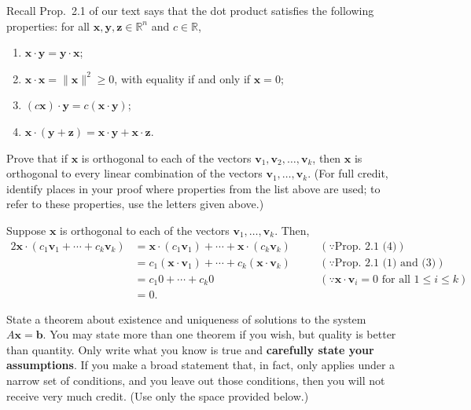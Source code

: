 \documentclass[addpoints,12pt]{exam}
\theoremstyle{remark}
\renewcommand{\vec}[1]{\mathbf{#1}}
\newcommand{\<}{\ensuremath{\langle}}
\renewcommand{\>}{\ensuremath{\rangle}}
\newcommand{\R}{\ensuremath{\mathbb{R}}}
\newcommand\vb{\vec{b}}
\newcommand\vv{\vec{v}}
\newcommand\vx{\vec{x}}
\newcommand\vy{\vec{y}}
\newcommand\vz{\vec{z}}
\begin{document}
\begin{questions}
\begin{parts}
  \end{parts}

\newpage


\question[10]
Recall Prop.~2.1 of our text says that the dot product satisfies the following properties:
for all $\vx, \vy, \vz \in \R^n$ and $c \in \R$,
\begin{enumerate}
\item $\vx \cdot \vy = \vy \cdot \vx$;
\item $\vx \cdot \vx = \|\vx\|^2 \geq 0$, with equality if and only if $\vx = 0$;
\item $(c\vx) \cdot \vy = c(\vx \cdot \vy)$;
\item $\vx \cdot (\vy + \vz) = \vx \cdot \vy + \vx \cdot \vz$.
\end{enumerate}

Prove that if $\vx$ is orthogonal to each of the vectors 
$\vv_1, \vv_2, \dots, \vv_k$, then  $\vx$ is orthogonal to every linear
combination of the vectors $\vv_1,\dots, \vv_k$.  (For full credit,
identify places in your proof where properties from the list above are used;
to refer to these properties, use the letters given above.)

\begin{solution}
  Suppose $\vx$ is orthogonal to each of the vectors $\vv_1,\dots, \vv_k$. Then,
  \begin{alignat*}{2}
    \vx \cdot (c_1 \vv_1 + \cdots + c_k \vv_k) 
    &= \vx\cdot (c_1 \vv_1) + \cdots + \vx\cdot (c_k \vv_k)
    &\quad & (\because \text{Prop.~2.1 (4)})\\
    &= c_1 (\vx\cdot \vv_1) + \cdots + c_k (\vx\cdot \vv_k)
    &\quad & (\because \text{Prop.~2.1 (1) and (3)})\\
    &= c_1 0 + \cdots + c_k 0 
    &\quad & (\because \vx\cdot \vv_i = 0 \text{ for all $1\leq i\leq k$})\\
    &= 0.
  \end{alignat*}
\end{solution}




\question[5] 
\label{qu:3}
State a theorem about existence and uniqueness of solutions to the system $A
    \vx = \vb$. You may state more than one theorem if you wish, but
    quality is better than quantity. Only write what you know is true and 
    {\bf carefully state your assumptions}.  If you make a broad statement that, in fact, only applies
    under a narrow set of conditions, and you leave out those conditions, then you will not receive
    very much credit. (Use only the space provided below.)
    

\end{questions}
\end{document}
